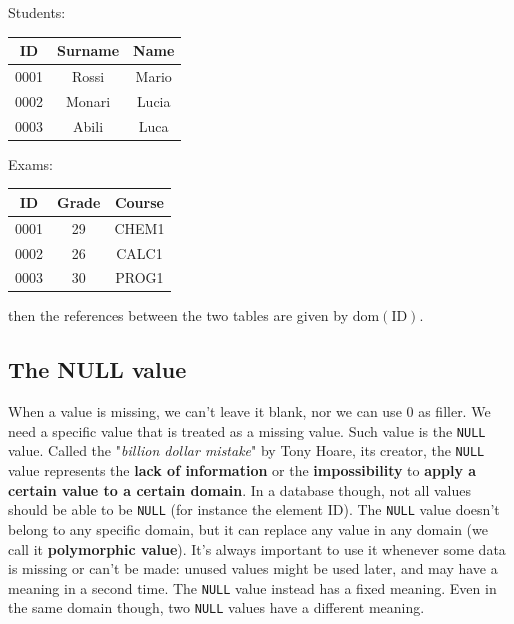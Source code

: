 \begin{center}
    Students: \quad
    \begin{tabular}{|c|c|c|}
        \hline \rowcolor{maindoccol!60}
        \textbf{ID} & \textbf{Surname} & \textbf{Name} \\
        \hline
        0001 & Rossi & Mario \\
        \hline
        0002 & Monari & Lucia \\
        \hline
        0003 & Abili & Luca \\
        \hline
    \end{tabular}
    \hspace{25pt}
    Exams: \quad
    \begin{tabular}{|c|c|c|}
        \hline \rowcolor{maindoccol!60}
        \textbf{ID} & \textbf{Grade} & \textbf{Course} \\
        \hline
        0001 & 29 & CHEM1 \\
        \hline
        0002 & 26 & CALC1 \\
        \hline
        0003 & 30 & PROG1 \\
        \hline
    \end{tabular}
\end{center}

then the references between the two tables are given by $\text{dom}(\text{ID})$.

\subsection{The NULL value}

When a value is missing, we can't leave it blank, nor we can use 0 as filler. We need a specific value that is treated as a missing value. Such value is the \texttt{NULL} value. Called the "\textit{billion dollar mistake}" by Tony Hoare, its creator, the \texttt{NULL} value represents the \textbf{lack of information} or the \textbf{impossibility} to \textbf{apply a certain value to a certain domain}. In a database though, not all values should be able to be \texttt{NULL} (for instance the element ID). The \texttt{NULL} value doesn't belong to any specific domain, but it can replace any value in any domain (we call it \textbf{polymorphic value}).
\nwl
It's always important to use it whenever some data is missing or can't be made: unused values might be used later, and may have a meaning in a second time. The \texttt{NULL} value instead has a fixed meaning. Even in the same domain though, two \texttt{NULL} values have a different meaning.

